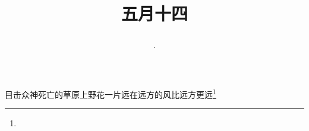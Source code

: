 \title{\date[d=19,m=6,y=2024][year:cn-y,年,month:cn,day:cn,日,·,weekday]·五月十四 }
目击众神死亡的草原上野花一片远在远方的风比远方更远\footnote{ }


